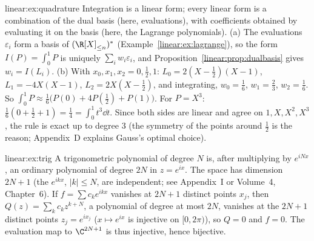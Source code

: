 \begin{solution}{linear:ex:quadrature}
\idea Integration is a linear form; every linear form is a combination of the dual basis (here, evaluations), with
coefficients obtained by evaluating it on the basis (here, the Lagrange polynomials).
\writeup (a) The evaluations $\varepsilon_i$ form a basis of $(\R[X]_{\le n})^*$ (Example~\ref{linear:ex:lagrange}), so the form
$I(P)=\int_0^1P$ is uniquely $\sum_iw_i\varepsilon_i$, and Proposition~\ref{linear:prop:dualbasis} gives $w_i=I(L_i)$.
(b) With $x_0,x_1,x_2=0,\frac12,1$: $L_0=2(X-\frac12)(X-1)$, $L_1=-4X(X-1)$, $L_2=2X(X-\frac12)$, and integrating,
$w_0=\frac16$, $w_1=\frac23$, $w_2=\frac16$. So $\int_0^1P\approx\frac16\bigl(P(0)+4P(\frac12)+P(1)\bigr)$. For $P=X^3$:
$\frac16(0+\frac12+1)=\frac14=\int_0^1t^3\dd t$. Since both sides are linear and agree on $1,X,X^2,X^3$, the rule is exact
up to degree $3$ (the symmetry of the points around $\frac12$ is the reason; Appendix~D explains Gauss's optimal choice).
\end{solution}

\begin{solution}{linear:ex:trig}
\idea A trigonometric polynomial of degree $N$ is, after multiplying by $e^{iNx}$, an ordinary polynomial of degree $2N$
in $z=e^{ix}$.
\writeup The space has dimension $2N+1$ (the $e^{ikx}$, $|k|\le N$, are independent; see Appendix~I or Volume~4,
Chapter~6). If $f=\sum c_ke^{ikx}$ vanishes at $2N+1$ distinct points $x_j$, then $Q(z)=\sum_kc_kz^{k+N}$, a polynomial of
degree at most $2N$, vanishes at the $2N+1$ distinct points $z_j=e^{ix_j}$ ($x\mapsto e^{ix}$ is injective on $[0,2\pi)$),
so $Q=0$ and $f=0$. The evaluation map to $\C^{2N+1}$ is thus injective, hence bijective.
\end{solution}

